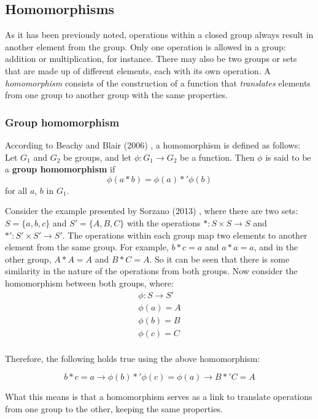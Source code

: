 \subsection{Homomorphisms}

As it has been previously noted, operations within a closed group always result in another element from the group. Only one operation is allowed in a group: addition or multiplication, for instance. There may also be two groups or sets that are made up of different elements, each with its own operation. A \emph{homomorphism} consists of the construction of a function that \emph{translates} elements from one group to another group with the same properties.

\subsubsection{Group homomorphism}

According to Beachy and Blair (2006) \cite{beachy2006abstract}, a homomorphism is defined as follows: Let $G_{1}$ and $G_{2}$ be groups, and let $\phi: G_{1} \rightarrow G_{2}$ be a function. Then $\phi$ is said to be a \textbf{group homomorphism} if
\[
\phi(a*b) = \phi(a) *' \phi(b)
\]
for all $a$, $b$ in $G_{1}$.

Consider the example presented by Sorzano (2013) \cite{sorzano2013}, where there are two sets: $S= \{a, b, c\}$ and $S' = \{A, B, C\}$  with the operations $*: S \times S \rightarrow S$ and $*' : S' \times S' \rightarrow S'$. The operations within each group map two elements to another element from the same group. For example, $b*c=a$ and $a*a=a$, and in the other group, $A*A = A$ and $B*C=A$. So it can be seen that there is some similarity in the nature of the operations from both groups. Now consider the homomorphism between both groups, where:
\[
\begin{split}
  \phi: S \rightarrow S' \\
  \phi(a) = A \\
  \phi(b) = B \\
  \phi(c) = C \\
\end{split}
\]

\noindent Therefore, the following holds true using the above homomorphism:

\[
b*c=a \rightarrow \phi(b) *' \phi(c) = \phi(a) \rightarrow B *' C = A
\]

What this means is that a homomorphism serves as a link to translate operations from one group to the other, keeping the same properties.

